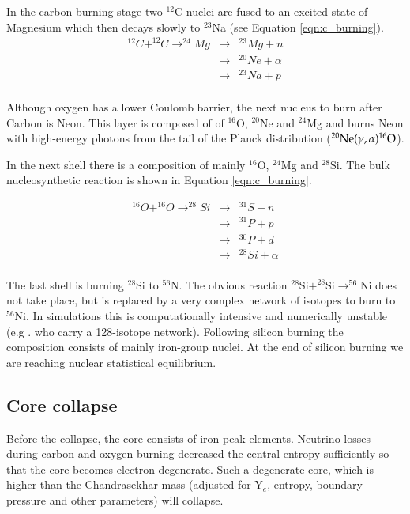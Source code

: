 In the carbon burning stage two $^{12}$C nuclei are fused to an excited state of Magnesium which then decays slowly to $^{23}$Na (see Equation \ref{eqn:c_burning}).
\begin{eqnarray}
^{12}C+^{12}C\rightarrow^{24}Mg&\rightarrow&^{23}Mg+n \nonumber \\
	&\rightarrow&^{20}Ne + \alpha \nonumber \\
	&\rightarrow&^{23}Na +p \nonumber \\
	\label{eqn:c_burning}
\end{eqnarray}

Although oxygen has a lower Coulomb barrier, the next nucleus to burn after Carbon is Neon. This layer is composed of of  $^{16}$O, $^{20}$Ne and $^{24}$Mg and burns Neon with high-energy photons from the tail of the Planck distribution ($\rm ^{20}Ne(\gamma,\alpha)^{16}O$). 

In the next shell there is a composition of mainly $^{16}$O, $^{24}$Mg and $^{28}$Si. The bulk nucleosynthetic reaction is shown in Equation \ref{eqn:c_burning}. 

\begin{eqnarray}
^{16}O+^{16}O\rightarrow^{28}Si&\rightarrow&^{31}S+n \nonumber \\
	&\rightarrow&^{31}P + p \nonumber \\
	&\rightarrow&^{30}P + d \nonumber \\
	&\rightarrow&^{28}Si + \alpha \nonumber \\
	\label{eqn:c_burning}
\end{eqnarray}

The last shell is burning $^{28}$Si to $^{56}$N. The obvious reaction $^{28}\textrm{Si}+^{28}\textrm{Si}\rightarrow^{56}\textrm{Ni}$ does not take place, but is replaced by a very complex network of isotopes to burn to $^{56}\textrm{Ni}$. In simulations this is computationally intensive and numerically unstable (e.g .  \citet{1978ApJ...225.1021W} who carry a 128-isotope network). 
Following silicon burning the composition consists of mainly iron-group nuclei. 
At the end of silicon burning we are reaching nuclear statistical equilibrium. 

\subsection{Core collapse} Before the collapse,  the core consists of iron peak elements. Neutrino losses during carbon and oxygen burning decreased the central entropy sufficiently so that the core becomes electron degenerate. Such a degenerate core, which is higher than the Chandrasekhar mass (adjusted for Y$_e$, entropy, boundary pressure and other parameters) will collapse. 

